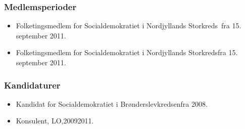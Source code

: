 \documentclass[11pt, a4paper]{awesome-cv}
\begin{document}
\begin{cvletter}
\subsubsection*{Medlemsperioder}
\begin{itemize}
\item Folketingsmedlem for Socialdemokratiet i Nordjyllands Storkreds fra 15. september 2011.
\item Folketingsmedlem for Socialdemokratiet i Nordjyllands Storkredsfra 15. september 2011.
\end{itemize}
\subsubsection*{Kandidaturer}
\begin{itemize}
\item Kandidat for Socialdemokratiet i Brønderslevkredsenfra 2008.
\end{itemize}
\begin{itemize}
\item Konsulent, LO,20092011.
\end{itemize}
\end{cvletter}
\end{document}
